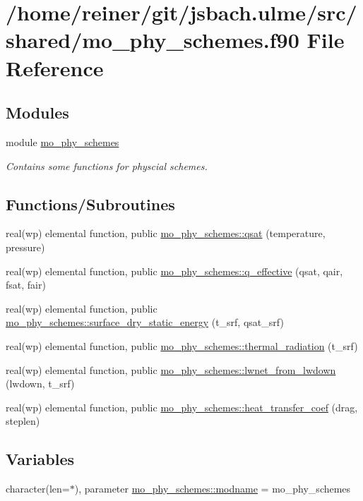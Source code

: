 \hypertarget{mo__phy__schemes_8f90}{}\section{/home/reiner/git/jsbach.ulme/src/shared/mo\+\_\+phy\+\_\+schemes.f90 File Reference}
\label{mo__phy__schemes_8f90}
\subsection*{Modules}
\begin{DoxyCompactItemize}
\item 
module \hyperlink{namespacemo__phy__schemes}{mo\+\_\+phy\+\_\+schemes}
\begin{DoxyCompactList}\small\item\em Contains some functions for physcial schemes. \end{DoxyCompactList}\end{DoxyCompactItemize}
\subsection*{Functions/\+Subroutines}
\begin{DoxyCompactItemize}
\item 
real(wp) elemental function, public \hyperlink{namespacemo__phy__schemes_aa793f9cf2db7aa0f821bde8fbf8f38a8}{mo\+\_\+phy\+\_\+schemes\+::qsat} (temperature, pressure)
\item 
real(wp) elemental function, public \hyperlink{namespacemo__phy__schemes_a52234cb76d1efb2d2298d8fc66b61545}{mo\+\_\+phy\+\_\+schemes\+::q\+\_\+effective} (qsat, qair, fsat, fair)
\item 
real(wp) elemental function, public \hyperlink{namespacemo__phy__schemes_afffc006f6b4ec423054e4e5f4943e19d}{mo\+\_\+phy\+\_\+schemes\+::surface\+\_\+dry\+\_\+static\+\_\+energy} (t\+\_\+srf, qsat\+\_\+srf)
\item 
real(wp) elemental function, public \hyperlink{namespacemo__phy__schemes_ad2fdf01327cefcddd7a762f414615551}{mo\+\_\+phy\+\_\+schemes\+::thermal\+\_\+radiation} (t\+\_\+srf)
\item 
real(wp) elemental function, public \hyperlink{namespacemo__phy__schemes_ace9a64c869caa711065208594ef8114e}{mo\+\_\+phy\+\_\+schemes\+::lwnet\+\_\+from\+\_\+lwdown} (lwdown, t\+\_\+srf)
\item 
real(wp) elemental function, public \hyperlink{namespacemo__phy__schemes_a9d1fe0b8e7cc0e86d2cf43ea5ebaac58}{mo\+\_\+phy\+\_\+schemes\+::heat\+\_\+transfer\+\_\+coef} (drag, steplen)
\end{DoxyCompactItemize}
\subsection*{Variables}
\begin{DoxyCompactItemize}
\item 
character(len=$\ast$), parameter \hyperlink{namespacemo__phy__schemes_a1bb1f1820a2d3f1246c68c21ab241ce6}{mo\+\_\+phy\+\_\+schemes\+::modname} = \textquotesingle{}mo\+\_\+phy\+\_\+schemes\textquotesingle{}
\end{DoxyCompactItemize}
